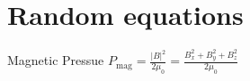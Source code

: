\section{Random equations}
Magnetic Pressue
$P_\text{mag} = \frac{|B|^2}{2\mu_0} = \frac{B_x^2 + B_y^2 + B_z^2}{2\mu_0}$
